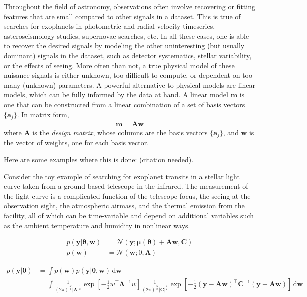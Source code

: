\documentclass{rnaastex}
\newcommand{\dd}{\ensuremath{\,\mathrm{d}}}
\newcommand{\bvec}[1]{{\ensuremath{\boldsymbol{#1}}}}
\newcommand{\citeme}{{\color{red}(citation needed)}}
\newcommand{\Gaussian}[3]{\ensuremath{\frac{1}{(2\pi)^\frac{#3}{2}|#2|^\frac{1}{2}} \exp\left[ -\frac{1}{2}#1^\top #2^{-1} #1 \right]}}
\begin{document}
Throughout the field of astronomy, observations often involve recovering or fitting features that are small compared to other signals in a dataset. This is true of searches for exoplanets in photometric and radial velocity timeseries, asteroseismology studies, supernovae searches, etc. In all these cases, one is able to recover the desired signals by modeling the other uninteresting (but usually dominant) signals in the dataset, such as detector systematics, stellar variability, or the effects of seeing. More often than not, a true physical model of these nuisance signals is either unknown, too difficult to compute, or dependent on too many (unknown) parameters. A powerful alternative to physical models are linear models, which can be fully informed by the data at hand. A linear model $\bvec{m}$ is one that can be constructed from a linear combination of a set of basis vectors $\{\bvec{a}_j\}$. In matrix form,
%
\begin{align}
\bvec{m} = \bvec{A} \bvec{w}
\end{align}
%
where $\bvec{A}$ is the \emph{design matrix}, whose columns are the basis vectors $\{\bvec{a}_j\}$, and $\bvec{w}$ is the vector of weights, one for each basis vector.

Here are some examples where this is done: \citeme.

Consider the toy example of searching for exoplanet transits in a stellar light curve taken from a ground-based telescope in the infrared. The measurement of the light curve is a complicated function of the telescope focus, the seeing at the observation sight, the atmospheric airmass, and the thermal emission from the facility, all of which can be time-variable and depend on additional variables such as the ambient temperature and humidity in nonlinear ways.

\begin{align}
p(\bvec{y} | \bvec{\theta}, \bvec{w}) &= \mathcal{N}(\bvec{y}; \bvec{\mu}(\bvec{\theta}) + \bvec{A}\bvec{w}, \bvec{C}) \nonumber\\
%
p(\bvec{w}) &= \mathcal{N}(\bvec{w}; 0, \bvec{\Lambda}) \nonumber
\end{align}

\begin{align}
p(\bvec{y} | \bvec{\theta}) &= \int p(\bvec{w}) p(\bvec{y} | \bvec{\theta}, \bvec{w}) \dd\bvec{w} \\
&= \int \Gaussian{w}{\bvec{\Lambda}}{K} \Gaussian{(\bvec{y} - \bvec{A}\bvec{w})}{\bvec{C}}{N} \dd\bvec{w}
\end{align}

\citep{Luger:2017,Luger:2016}


\end{document}
